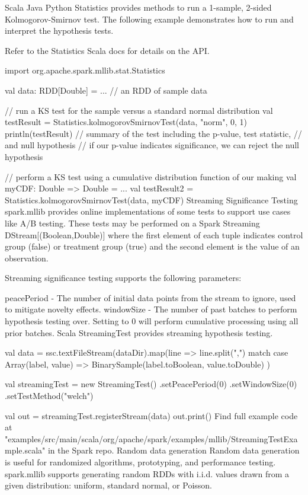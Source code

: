 Scala
Java
Python
Statistics provides methods to run a 1-sample, 2-sided Kolmogorov-Smirnov test. The following example demonstrates how to run and interpret the hypothesis tests.

Refer to the Statistics Scala docs for details on the API.

import org.apache.spark.mllib.stat.Statistics

val data: RDD[Double] = ... // an RDD of sample data

// run a KS test for the sample versus a standard normal distribution
val testResult = Statistics.kolmogorovSmirnovTest(data, "norm", 0, 1)
println(testResult) // summary of the test including the p-value, test statistic,
                    // and null hypothesis
                    // if our p-value indicates significance, we can reject the null hypothesis

// perform a KS test using a cumulative distribution function of our making
val myCDF: Double => Double = ...
val testResult2 = Statistics.kolmogorovSmirnovTest(data, myCDF)
Streaming Significance Testing
spark.mllib provides online implementations of some tests to support use cases like A/B testing. These tests may be performed on a Spark Streaming DStream[(Boolean,Double)] where the first element of each tuple indicates control group (false) or treatment group (true) and the second element is the value of an observation.

Streaming significance testing supports the following parameters:

peacePeriod - The number of initial data points from the stream to ignore, used to mitigate novelty effects.
windowSize - The number of past batches to perform hypothesis testing over. Setting to 0 will perform cumulative processing using all prior batches.
Scala
StreamingTest provides streaming hypothesis testing.

val data = ssc.textFileStream(dataDir).map(line => line.split(",") match {
  case Array(label, value) => BinarySample(label.toBoolean, value.toDouble)
})

val streamingTest = new StreamingTest()
  .setPeacePeriod(0)
  .setWindowSize(0)
  .setTestMethod("welch")

val out = streamingTest.registerStream(data)
out.print()
Find full example code at "examples/src/main/scala/org/apache/spark/examples/mllib/StreamingTestExample.scala" in the Spark repo.
Random data generation
Random data generation is useful for randomized algorithms, prototyping, and performance testing. spark.mllib supports generating random RDDs with i.i.d. values drawn from a given distribution: uniform, standard normal, or Poisson.

